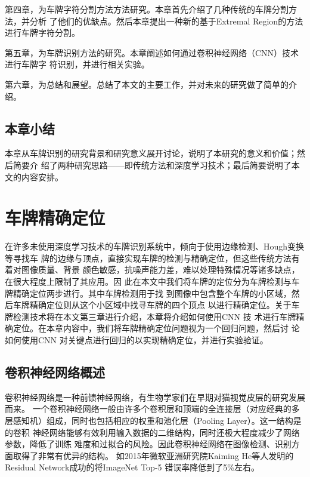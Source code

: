 第四章，为车牌字符分割方法方法研究。本章首先介绍了几种传统的车牌分割方法，并分析
了他们的优缺点。然后本章提出一种新的基于Extremal Region的方法进行车牌字符分割。

第五章，为车牌识别方法的研究。本章阐述如何通过卷积神经网络（CNN）技术进行车牌字
符识别，并进行相关实验。

第六章，为总结和展望。总结了本文的主要工作，并对未来的研究做了简单的介绍。

\section{本章小结}

本章从车牌识别的研究背景和研究意义展开讨论，说明了本研究的意义和价值；然后简要介
绍了两种研究思路——即传统方法和深度学习技术；最后简要说明了本文的内容安排。

\chapter{车牌精确定位}

在许多未使用深度学习技术的车牌识别系统中，倾向于使用边缘检测、Hough变换等寻找车
牌的边缘与顶点，直接实现车牌的检测与精确定位，但这些传统方法有着对图像质量、背景
颜色敏感，抗噪声能力差，难以处理特殊情况等诸多缺点，在很大程度上限制了其应用。因
此在本文中我们将车牌的定位分为车牌检测与车牌精确定位两步进行。其中车牌检测用于找
到图像中包含整个车牌的小区域，然后车牌精确定位则从这个小区域中找寻车牌的四个顶点
以进行精确定位。关于车牌检测技术将在本文第三章进行介绍，本章将介绍如何使用CNN 技
术进行车牌精确定位。在本章内容中，我们将车牌精确定位问题视为一个回归问题，然后讨
论如何使用CNN 对关键点进行回归的以实现精确定位，并进行实验验证。

\section{卷积神经网络概述}

卷积神经网络是一种前馈神经网络，有生物学家们在早期对猫视觉皮层的研究发展而来。
一个卷积神经网络一般由许多个卷积层和顶端的全连接层（对应经典的多
层感知机）组成，同时也包括相应的权重和池化层（Pooling Layer）。这一结构是的卷积
神经网络能够有效利用输入数据的二维结构，同时还极大程度减少了网络参数，降低了训练
难度和过拟合的风险。因此卷积神经网络在图像检测、识别方面取得了非常有优异的结构。
如2015年微软亚洲研究院Kaiming He等人发明的Residual Network成功的将ImageNet Top-5
错误率降低到了5\%左右\cite{He:2015tt}\cite{He:2016tq}。

